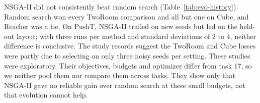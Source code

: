 NSGA-II did not consistently beat random search (Table~\ref{tab:evo-history}). Random
search won every TwoRoom comparison and all but one on Cube, and Reacher was a tie. On
PushT, NSGA-II trailed on new seeds but led on the held-out layout; with three runs per
method and standard deviations of 2 to 4, neither difference is conclusive. The study
records suggest the TwoRoom and Cube losses were partly due to selecting on only three
noisy seeds per setting.
These studies were exploratory. Their objectives, budgets and optimizer differ from
task 17, so we neither pool them nor compare them across tasks. They show only that
NSGA-II gave no reliable gain over random search at these small budgets, not that
evolution cannot help.
